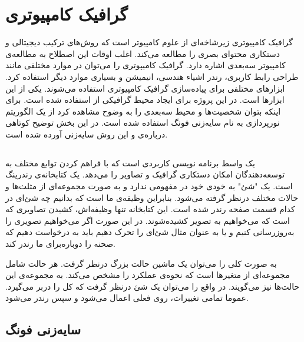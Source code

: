\section{گرافیک کامپیوتری}

گرافیک کامپیوتری زیرشاخه‌ای از علوم کامپیوتر است که روش‌های 
ترکیب دیجیتالی و دستکاری محتوای بصری 
را مطالعه می‌کند.
اغلب اوقات این اصطلاح به مطالعه‌ی 
کامپیوتر سه‌بعدی اشاره دارد.
\cite{ComputerGraphicsWikipedia}
گرافیک کامیپوتری را می‌توان در 
موارد مختلفی مانند طراحی رابط کاربری،
رندر اشیاء هندسی، انیمیشن و بسیاری 
موارد دیگر استفاده کرد.
ابزارهای مختلفی برای پیاده‌سازی گرافیک کامپیوتری استفاده می‌شوند.
یکی از این ابزار‌ها 
است.
در این پروژه برای ایجاد محیط گرافیکی از 
استفاده شده است.
برای اینکه بتوان شخصیت‌ها و محیط سه‌بعدی را به وضوح مشاهده کرد از یک الگوریتم نورپردازی به نام 
سایه‌زنی فونگ استفاده شده است.
در این بخش توضیح کوتاهی دربا‌ره‌ی
 و
این روش سایه‌زنی آورده شده است.

\subsection {
    }

یک واسط برنامه نویسی کاربردی  
است که با فراهم کردن توابع مختلف به توسعه‌دهندگان امکان دستکاری گرافیک و تصاویر را می‌دهد.
یک کتابخانه‌ی رندرینگ است.
یک "شئ" به خودی خود در
مفهومی ندارد
و به صورت مجموعه‌ای از مثلث‌ها و حالات مختلف درنظر گرفته می‌شود. بنابراین  
وظیفه‌ی ما است که بدانیم چه شئ‌ای در کدام قسمت صفحه رندر شده است. این کتابخانه تنها وظیفه‌اش، کشیدن تصاویری که است که می‌خواهیم به تصویر کشیده‌شوند.
در این صورت اگر می‌خواهیم تصویری را به‌روزرسانی کنیم و یا به عنوان مثال شئ‌ای را تحرک دهیم باید به 
درخواست دهیم که صحنه را دوباره‌برای ما رندر کند.
\cite{KhronosUsingOpenGL}

به صورت کلی 
را می‌توان یک ماشین حالت بزرگ درنظر گرفت. هر حالت شامل مجموعه‌ای از متغیر‌ها است که نحوه‌ی عملکرد
را مشخص می‌کند. 
به مجموعه‌ی این حالت‌ها 
نیز می‌گویند. 
در واقع  
را می‌توان یک شئ درنظر گرفت که کل
را دربر می‌گیرد. عموما تمامی تغییرات، روی 
فعلی اعمال می‌شود و سپس رندر می‌شود.
\cite{KhronosUsingOpenGL} \cite{LearnOpenGL_GettingStarted}


\subsection{سایه‌زنی فونگ}

